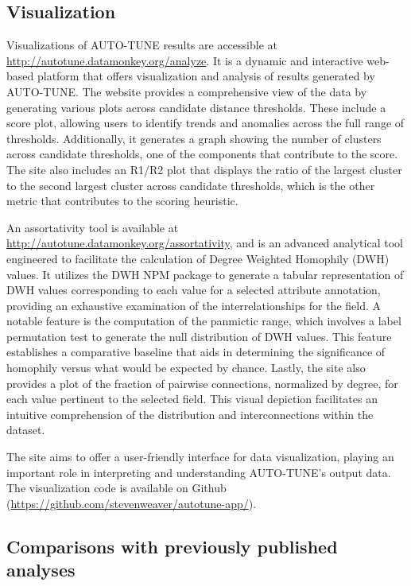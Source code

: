 \documentclass[utf8]{FrontiersinHarvard} %
\newcommand{\TODO}[1]{{\color{red}{#1}}}
\begin{document}
\subsection{Visualization}

Visualizations of AUTO-TUNE results are accessible at \url{http://autotune.datamonkey.org/analyze}. It is a dynamic and interactive web-based platform that offers visualization and analysis of results generated by AUTO-TUNE. 
The website provides a comprehensive view of the data by generating various plots across candidate distance thresholds. These include a score plot, allowing users to identify trends and anomalies across the full range of thresholds. Additionally, it generates a graph showing the number of clusters across candidate thresholds, one of the components that contribute to the score. The site also includes an R1/R2 plot that displays the ratio of the largest cluster to the second largest cluster across candidate thresholds, which is the other metric that contributes to the scoring heuristic.  \TODO{this could benefit from referencing a figure showing such plots}

An assortativity tool is available at \url{http://autotune.datamonkey.org/assortativity}, and is an advanced analytical tool engineered to facilitate the calculation of Degree Weighted Homophily (DWH) values. It utilizes the DWH NPM package to generate a tabular representation of DWH values corresponding to each value for a selected attribute annotation, providing an exhaustive examination of the interrelationships for the field.
A notable feature is the computation of the panmictic range, which involves a label permutation test to generate the null distribution of DWH values. This feature establishes a comparative baseline that aids in determining the significance of homophily versus what would be expected by chance.
Lastly, the site also provides a plot of the fraction of pairwise connections, normalized by degree, for each value pertinent to the selected field. This visual depiction facilitates an intuitive comprehension of the distribution and interconnections within the dataset.

The site aims to offer a user-friendly interface for data visualization, playing an important role in interpreting and understanding AUTO-TUNE's output data. The visualization code is available on Github (\url{https://github.com/stevenweaver/autotune-app/}).


\subsection{Comparisons with previously published analyses}
\end{document}

